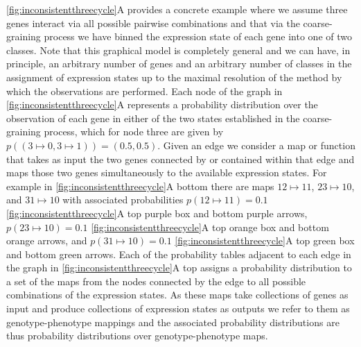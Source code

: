 \ref{fig:inconsistentthreecycle}A provides a concrete example where we assume three genes interact via all possible pairwise combinations and that via the coarse-graining process we have binned the expression state of each gene into one of two classes. Note that this graphical model is completely general and we can have, in principle, an arbitrary number of genes and an arbitrary number of classes in the assignment of expression states up to the maximal resolution of the method by which the observations are performed. Each node of the graph in \ref{fig:inconsistentthreecycle}A represents a probability distribution over the observation of each gene in either of the two states established in the coarse-graining process, which for node three are given by $p((3 \mapsto 0, 3 \mapsto 1))=(0.5,0.5)$. Given an edge we consider a map or function that takes as input the two genes connected by or contained within that edge and maps those two genes simultaneously to the available expression states. For example in \ref{fig:inconsistentthreecycle}A bottom there are maps $12 \mapsto 11$, $23 \mapsto 10$, and $31 \mapsto 10$ with associated probabilities $p(12 \mapsto 11)=0.1$ \ref{fig:inconsistentthreecycle}A top purple box and bottom purple arrows, $p(23 \mapsto 10)=0.1$ \ref{fig:inconsistentthreecycle}A top orange box and bottom orange arrows, and $p(31 \mapsto 10)=0.1$ \ref{fig:inconsistentthreecycle}A top green box and bottom green arrows. Each of the probability tables adjacent to each edge in the graph in \ref{fig:inconsistentthreecycle}A top assigns a probability distribution to a set of the maps from the nodes connected by the edge to all possible combinations of the expression states. As these maps take collections of genes as input and produce collections of expression states as outputs we refer to them as genotype-phenotype mappings and the associated probability distributions are thus probability distributions over genotype-phenotype maps.

